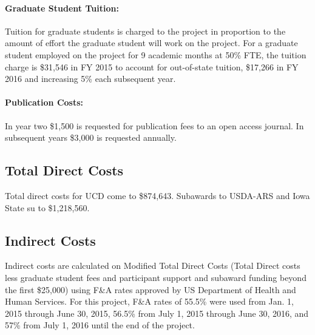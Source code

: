 \paragraph{Graduate Student Tuition:}
Tuition for graduate students is charged to the project in proportion to the amount of effort the graduate student will work on the project. For a graduate student employed on the project for 9 academic months at 50\% FTE, the tuition charge is \$31,546 in FY 2015 to account for out-of-state tuition, \$17,266 in FY 2016 and increasing 5\% each subsequent year.

\paragraph{Publication Costs:}
In year two \$1,500 is requested for publication fees to an open access journal.  In subsequent years \$3,000 is requested annually.

\subsection*{Total Direct Costs}

Total direct costs for UCD come to \$874,643.  Subawards to USDA-ARS and Iowa State su to \$1,218,560.

\subsection*{Indirect Costs}
Indirect costs are calculated on Modified Total Direct Costs (Total Direct costs less graduate student fees and participant support and subaward funding beyond the first \$25,000) using F\&A rates approved by US Department of Health and Human Services. For this project, F\&A rates of 55.5\% were used from Jan. 1, 2015 through June 30, 2015, 56.5\% from July 1, 2015 through June 30, 2016, and 57\% from July 1, 2016 until the end of the project.



